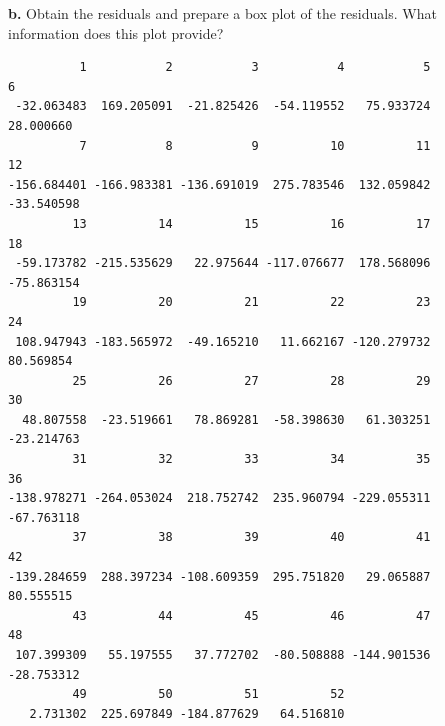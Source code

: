 \documentclass[
  letterpaper,
  DIV=11,
  numbers=noendperiod]{scrartcl}
\newenvironment{Shaded}{\begin{snugshade}}{\end{snugshade}}
\newcommand{\FunctionTok}[1]{\textcolor[rgb]{0.28,0.35,0.67}{#1}}
\newcommand{\NormalTok}[1]{\textcolor[rgb]{0.00,0.23,0.31}{#1}}
\newcommand{\SpecialCharTok}[1]{\textcolor[rgb]{0.37,0.37,0.37}{#1}}
\begin{document}
\textbf{b.} Obtain the residuals and prepare a box plot of the
residuals. What information does this plot provide?

\begin{Shaded}
\end{Shaded}

\begin{verbatim}
          1           2           3           4           5           6 
 -32.063483  169.205091  -21.825426  -54.119552   75.933724   28.000660 
          7           8           9          10          11          12 
-156.684401 -166.983381 -136.691019  275.783546  132.059842  -33.540598 
         13          14          15          16          17          18 
 -59.173782 -215.535629   22.975644 -117.076677  178.568096  -75.863154 
         19          20          21          22          23          24 
 108.947943 -183.565972  -49.165210   11.662167 -120.279732   80.569854 
         25          26          27          28          29          30 
  48.807558  -23.519661   78.869281  -58.398630   61.303251  -23.214763 
         31          32          33          34          35          36 
-138.978271 -264.053024  218.752742  235.960794 -229.055311  -67.763118 
         37          38          39          40          41          42 
-139.284659  288.397234 -108.609359  295.751820   29.065887   80.555515 
         43          44          45          46          47          48 
 107.399309   55.197555   37.772702  -80.508888 -144.901536  -28.753312 
         49          50          51          52 
   2.731302  225.697849 -184.877629   64.516810 
\end{verbatim}

\begin{Shaded}
\end{Shaded}
\end{document}
